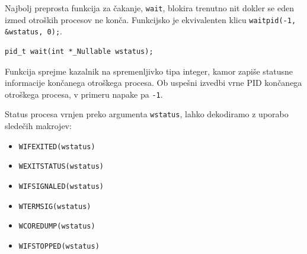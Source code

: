 \documentclass[a4paper,12pt,openright]{book}
\begin{document}
Najbolj preprosta funkcija za čakanje, \texttt{wait}, blokira trenutno nit dokler se eden izmed otroških procesov ne konča.
Funkcijsko je ekvivalenten klicu \verb|waitpid(-1, &wstatus, 0);|.

\begin{lstlisting}[style=func]
 pid_t wait(int *_Nullable wstatus);
\end{lstlisting}

Funkcija sprejme kazalnik na spremenljivko tipa integer, kamor zapiše statusne informacije končanega otroškega procesa.
Ob uspešni izvedbi vrne PID končanega otroškega procesa, v primeru napake pa \texttt{-1}.

Status procesa vrnjen preko argumenta \texttt{wstatus}, lahko dekodiramo z uporabo sledečih makrojev:
\begin{itemize}
	\item \texttt{WIFEXITED(wstatus)}
	\item \texttt{WEXITSTATUS(wstatus)}
	\item \texttt{WIFSIGNALED(wstatus)}
	\item \texttt{WTERMSIG(wstatus)}
	\item \texttt{WCOREDUMP(wstatus)}
	\item \texttt{WIFSTOPPED(wstatus)}
	      \begin{description}

\end{description}
\end{itemize}
\end{document}

